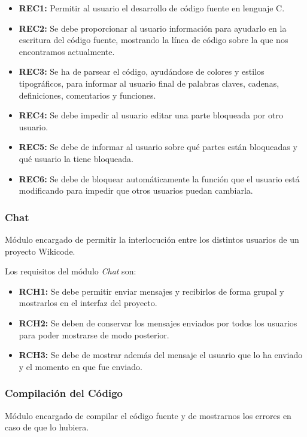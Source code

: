 \begin{itemize}
	\item \textbf{REC1:} Permitir al usuario el desarrollo de código fuente en lenguaje C.
	\item \textbf{REC2:} Se debe proporcionar al usuario información para ayudarlo en la escritura del código fuente, mostrando la línea de código sobre la que nos encontramos actualmente.
	\item \textbf{REC3:} Se ha de parsear el código, ayudándose de colores y estilos tipográficos, para informar al usuario final de palabras claves, cadenas, definiciones, comentarios y funciones.
	\item \textbf{REC4:} Se debe impedir al usuario editar una parte bloqueada por otro usuario. 
	\item \textbf{REC5:} Se debe de informar al usuario sobre qué partes están bloqueadas y qué usuario la tiene bloqueada.
	\item \textbf{REC6:} Se debe de bloquear automáticamente la función que el usuario está modificando para impedir que otros usuarios puedan cambiarla.
\end{itemize}
	
\subsubsection{Chat}

Módulo encargado de permitir la interlocución entre los distintos usuarios de un proyecto Wikicode.

Los requisitos del módulo \emph{Chat} son:

\begin{itemize}
	\item \textbf{RCH1:} Se debe permitir enviar mensajes y recibirlos de forma grupal y mostrarlos en el interfaz del proyecto.
	\item \textbf{RCH2:} Se deben de conservar los mensajes enviados por todos los usuarios para poder mostrarse de modo posterior.
	\item \textbf{RCH3:} Se debe de mostrar además del mensaje el usuario que lo ha enviado y el momento en que fue enviado.
\end{itemize}
	
\subsubsection{Compilación del Código}

Módulo encargado de compilar el código fuente y de mostrarnos los errores en caso de que lo hubiera.

